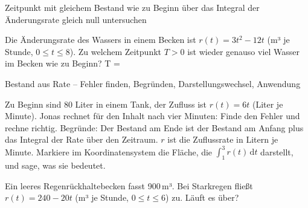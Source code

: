 \begin{aufgabe}{Zeitpunkt mit gleichem Bestand wie zu Beginn über das Integral der Änderungsrate gleich null untersuchen}
\begin{teile}
\teil Die Änderungsrate des Wassers in einem Becken ist $r(t) = 3t^2 - 12t$ (m³ je Stunde, $0 \le t \le 8$). Zu welchem Zeitpunkt $T > 0$ ist wieder genauso viel Wasser im Becken wie zu Beginn? T = \leerfeld
\end{teile}
\end{aufgabe}

\begin{aufgabe}{Bestand aus Rate – Fehler finden, Begründen, Darstellungswechsel, Anwendung}
\begin{teile}
\teil Zu Beginn sind 80 Liter in einem Tank, der Zufluss ist $r(t) = 6t$ (Liter je Minute). Jonas rechnet für den Inhalt nach vier Minuten:  Finde den Fehler und rechne richtig.
\teil Begründe: Der Bestand am Ende ist der Bestand am Anfang plus das Integral der Rate über den Zeitraum.
\teil $r$ ist die Zuflussrate in Litern je Minute. Markiere im Koordinatensystem die Fläche, die $∫_1^3 r(t)\,\mathrm{d}t$ darstellt, und sage, was sie bedeutet.

\begin{ksys}[xmin=0,xmax=5,ymin=0,ymax=5,xlabel=t,ylabel=r]  \end{ksys}
\teil Ein leeres Regenrückhaltebecken fasst 900\,m³. Bei Starkregen fließt $r(t) = 240 - 20t$ (m³ je Stunde, $0 \le t \le 6$) zu. Läuft es über?
\end{teile}
\end{aufgabe}
